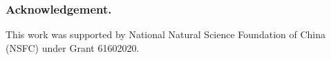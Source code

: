 \documentclass[letterpaper]{article} %
\begin{document}

        \subsubsection{Acknowledgement.} This work was supported by National Natural Science Foundation of China (NSFC) under Grant 61602020.









\end{document}
